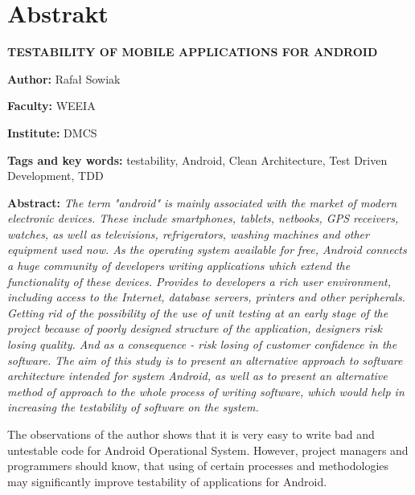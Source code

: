 \chapter*{Abstrakt}
\label{abstract}

\textbf{TESTABILITY OF MOBILE APPLICATIONS FOR ANDROID}

\vspace{20pt}

\textbf{Author:} Rafał Sowiak

\textbf{Faculty:} WEEIA

\textbf{Institute:} DMCS

\textbf{Tags and key words:} testability, Android, Clean Architecture, Test Driven Development, TDD

\textbf{Abstract:} 
\textit{The term "android" is mainly associated with the market of modern electronic devices. These include smartphones, tablets, netbooks, GPS receivers, watches, as well as televisions, refrigerators, washing machines and other equipment used now. As the operating system available for free, Android connects a huge community of developers writing applications which extend the functionality of these devices. Provides to developers a rich user environment, including access to the Internet, database servers, printers and other peripherals. Getting rid of the possibility of the use of unit testing at an early stage of the project because of poorly designed structure of the application, designers risk losing quality. And as a consequence - risk losing of customer confidence in the software. The aim of this study is to present an alternative approach to software architecture intended for system Android, as well as to present an alternative method of approach to the whole process of writing software, which would help in increasing the testability of software on the system.}

The observations of the author shows that it is very easy to write bad and untestable code for Android Operational System. However, project managers and programmers should know, that using of certain processes and methodologies may significantly improve testability of applications for Android.

